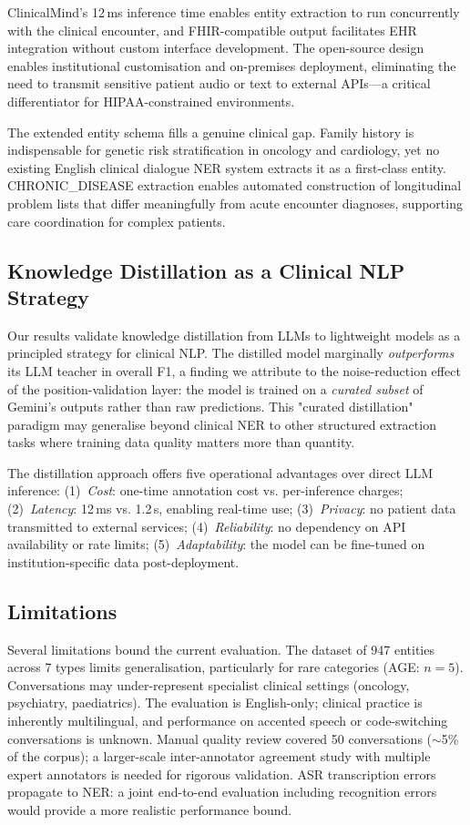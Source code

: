 \documentclass[conference]{IEEEtran}
\begin{document}
ClinicalMind's 12\,ms inference time enables entity extraction to run
concurrently with the clinical encounter, and FHIR-compatible output
facilitates EHR integration without custom interface development. The
open-source design enables institutional customisation and on-premises
deployment, eliminating the need to transmit sensitive patient audio or
text to external APIs—a critical differentiator for HIPAA-constrained
environments.

The extended entity schema fills a genuine clinical gap. Family history is
indispensable for genetic risk stratification in oncology and cardiology, yet
no existing English clinical dialogue NER system extracts it as a first-class
entity. CHRONIC\_DISEASE extraction enables automated construction of
longitudinal problem lists that differ meaningfully from acute encounter
diagnoses, supporting care coordination for complex patients.

\subsection{Knowledge Distillation as a Clinical NLP Strategy}

Our results validate knowledge distillation from LLMs to lightweight models
as a principled strategy for clinical NLP. The distilled model marginally
\emph{outperforms} its LLM teacher in overall F1, a finding we attribute to
the noise-reduction effect of the position-validation layer: the model is
trained on a \emph{curated subset} of Gemini's outputs rather than raw
predictions. This "curated distillation" paradigm may generalise beyond
clinical NER to other structured extraction tasks where training data quality
matters more than quantity.

The distillation approach offers five operational advantages over direct LLM
inference: (1)~\emph{Cost}: one-time annotation cost vs. per-inference charges;
(2)~\emph{Latency}: 12\,ms vs. 1.2\,s, enabling real-time use; (3)~\emph{Privacy}:
no patient data transmitted to external services; (4)~\emph{Reliability}: no
dependency on API availability or rate limits; (5)~\emph{Adaptability}: the
model can be fine-tuned on institution-specific data post-deployment.

\subsection{Limitations}

Several limitations bound the current evaluation. The dataset of 947 entities
across 7 types limits generalisation, particularly for rare categories
(AGE: $n\!=\!5$). Conversations may under-represent specialist clinical
settings (oncology, psychiatry, paediatrics). The evaluation is English-only;
clinical practice is inherently multilingual, and performance on accented
speech or code-switching conversations is unknown. Manual quality review
covered 50 conversations ($\sim$5\% of the corpus); a larger-scale inter-annotator
agreement study with multiple expert annotators is needed for rigorous validation.
ASR transcription errors propagate to NER: a joint end-to-end evaluation
including recognition errors would provide a more realistic performance bound.
\end{document}

